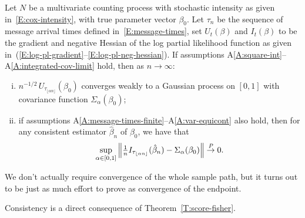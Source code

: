 \documentclass[aoas,preprint]{imsart}
\begin{document}
\begin{theorem}\label{T:score-fisher}
    Let $N$ be a multivariate counting process with stochastic
    intensity as given in~\eqref{E:cox-intensity}, with true parameter
    vector $\beta_0$.  Let $\tau_n$ be the sequence of message arrival times
    defined in~\eqref{E:message-times}, set $U_t(\beta)$ and $I_t(\beta)$ to
    be the gradient and negative Hessian of the log partial likelihood function
    as given in~(\ref{E:log-pl-gradient}--\ref{E:log-pl-neg-hessian}).  If
    assumptions A\ref{A:square-int}--A\ref{A:integrated-cov-limit} hold, then
    as $n \to \infty$:
    \begin{enumerate}[(i)]
        \item \label{I:score-part}
        $n^{-1/2} \, U_{\tau_{\lfloor \alpha n \rfloor}}(\beta_0)$
        converges weakly to a Gaussian process on $[0,1]$ with
        covariance function $\Sigma_\alpha(\beta_0)$;

        \item \label{I:fisher-part}
        if assumptions
        A\ref{A:message-times-finite}--A\ref{A:var-equicont} also hold, then for any consistent
        estimator $\hat \beta_n$ of $\beta_0$,
        we have that
        \[
            \sup_{\alpha \in [0,1]}
            \left\|
                \tfrac{1}{n}
                I_{\tau_{\lfloor \alpha n \rfloor}}(\hat \beta_{n})
                -
                \Sigma_\alpha(\beta_0)
            \right\|
            \overset{\mathit{P}}{\to}
            0.
        \]
    \end{enumerate}
\end{theorem}

\noindent
We don't actually require convergence of the whole sample path, but
it turns out to be just as much effort to prove as convergence of the
endpoint.  

Consistency is a direct consequence of
Theorem~\ref{T:score-fisher}.
\end{document}
